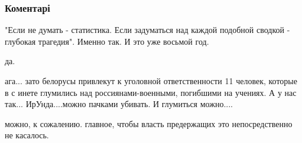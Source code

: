  
 
 
 
 
\subsubsection{Коментарі}

\begin{itemize} %

"Если не думать - статистика. Если задуматься над каждой подобной сводкой -
глубокая трагедия". Именно так. И это уже восьмой год.

да.


ага... зато белорусы привлекут к уголовной ответственности 11 человек, которые
в с инете глумились над россиянами-военными, погибшими на учениях. А у нас
так... ИрУнда....можно пачками убивать. И глумиться можно....

можно, к сожалению. главное, чтобы власть предержащих это непосредственно не касалось.
\end{itemize} %
